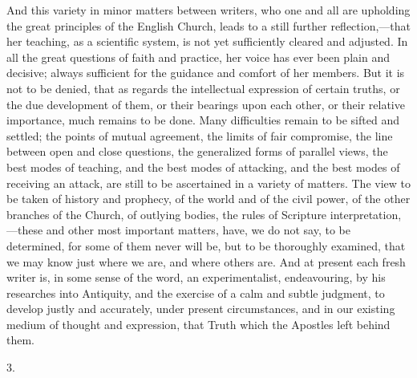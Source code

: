 And this variety in minor matters between
writers, who one and all are upholding the great principles of the
English Church, leads to a still further reflection,—that her
teaching, as a scientific system, is not yet sufficiently cleared and
adjusted. In all the great questions of faith and practice, her voice
has ever been plain and decisive; always sufficient for the guidance
and comfort of her members. But it is not to be denied, that as
regards the intellectual expression of certain truths, or the due
development of them, or their bearings upon each other, or their
relative importance, much remains to be done. Many difficulties remain
to be sifted and settled; the points of mutual agreement, the limits
of fair compromise, the line between open and close questions, the
generalized forms of parallel views, the best modes of teaching, and
the best modes of attacking, and the best modes of receiving an
attack, are still to be ascertained in a variety of matters. The view
to be taken of history and prophecy, of the world and of the civil
power, of the other branches of the Church, of outlying bodies, the
rules of Scripture interpretation,—these and other most important
matters, have, we do not say, to be determined, for some of them
never will be, but to be thoroughly examined, that we may know just
where we are, and where others are. And at present each fresh writer
is, in some sense of the word, an experimentalist, endeavouring, by
his researches into Antiquity, and the exercise of a calm and subtle
judgment, to develop justly and accurately, under present
circumstances, and in our existing medium of thought and expression,
that Truth which the Apostles left behind them.

3.

